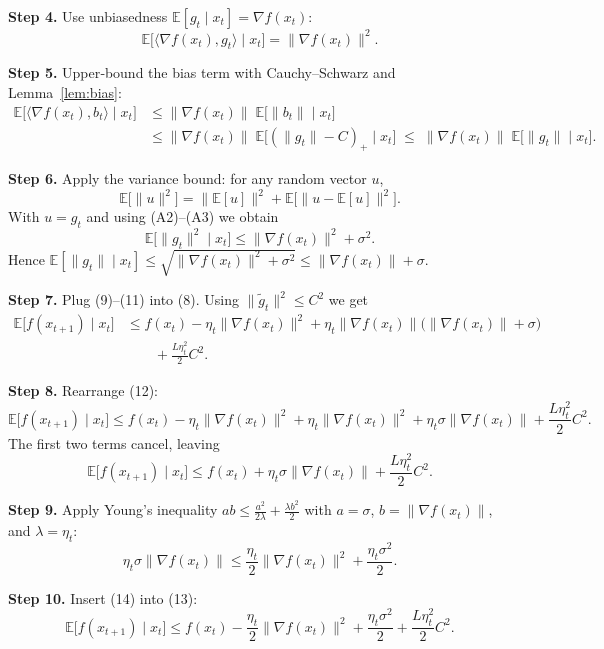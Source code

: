 \documentclass{article}
\newcommand{\E}{\mathbb{E}}
\begin{document}
\noindent\textbf{Step 4.} Use unbiasedness $\E[g_t\mid x_t]=\nabla f(x_t)$:
\[
\E\!\bigl[\langle\nabla f(x_t),g_t\rangle\mid x_t\bigr]=\|\nabla f(x_t)\|^{2}.
\tag{9}
\]

\noindent\textbf{Step 5.} Upper‑bound the bias term with Cauchy–Schwarz and Lemma~\ref{lem:bias}:
\[
\begin{aligned}
\E\!\bigl[\langle\nabla f(x_t),b_t\rangle\mid x_t\bigr]
&\le \|\nabla f(x_t)\|\;\E\!\bigl[\|b_t\|\mid x_t\bigr]   \\
&\le \|\nabla f(x_t)\|\;\E\!\bigl[(\|g_t\|-C)_{+}\mid x_t\bigr]
   \;\le\; \|\nabla f(x_t)\|\;\E\!\bigl[\|g_t\|\mid x_t\bigr].
\end{aligned}
\tag{10}
\]

\noindent\textbf{Step 6.} Apply the variance bound: for any random vector $u$,
\[
\E\!\bigl[\|u\|^{2}\bigr]=\|\E[u]\|^{2}+\E\!\bigl[\|u-\E[u]\|^{2}\bigr].
\]
With $u=g_t$ and using (A2)–(A3) we obtain
\[
\E\!\bigl[\|g_t\|^{2}\mid x_t\bigr]\le \|\nabla f(x_t)\|^{2}+\sigma^{2}.
\tag{11}
\]
Hence $\E[\|g_t\|\mid x_t]\le\sqrt{\|\nabla f(x_t)\|^{2}+\sigma^{2}}\le \|\nabla f(x_t)\|+\sigma$.

\noindent\textbf{Step 7.} Plug (9)–(11) into (8). Using $\|\tilde g_t\|^{2}\le C^{2}$ we get
\[
\begin{aligned}
\E\!\bigl[f(x_{t+1})\mid x_t\bigr]
&\le f(x_t)-\eta_t\|\nabla f(x_t)\|^{2}
    +\eta_t\|\nabla f(x_t)\|\bigl(\|\nabla f(x_t)\|+\sigma\bigr)  \\
&\qquad +\frac{L\eta_t^{2}}{2}C^{2}.
\end{aligned}
\tag{12}
\]

\noindent\textbf{Step 8.} Rearrange (12):
\[
\E\!\bigl[f(x_{t+1})\mid x_t\bigr]
\le f(x_t)-\eta_t\|\nabla f(x_t)\|^{2}
      +\eta_t\|\nabla f(x_t)\|^{2}
      +\eta_t\sigma\|\nabla f(x_t)\|
      +\frac{L\eta_t^{2}}{2}C^{2}.
\]
The first two terms cancel, leaving
\[
\E\!\bigl[f(x_{t+1})\mid x_t\bigr]
\le f(x_t)+\eta_t\sigma\|\nabla f(x_t)\|
      +\frac{L\eta_t^{2}}{2}C^{2}.
\tag{13}
\]

\noindent\textbf{Step 9.} Apply Young’s inequality $ab\le \frac{a^{2}}{2\lambda}+\frac{\lambda b^{2}}{2}$ with $a=\sigma$, $b=\|\nabla f(x_t)\|$, and $\lambda = \eta_t$:
\[
\eta_t\sigma\|\nabla f(x_t)\|
\le \frac{\eta_t}{2}\|\nabla f(x_t)\|^{2}
   +\frac{\eta_t\sigma^{2}}{2}.
\tag{14}
\]

\noindent\textbf{Step 10.} Insert (14) into (13):
\[
\E\!\bigl[f(x_{t+1})\mid x_t\bigr]
\le f(x_t)-\frac{\eta_t}{2}\|\nabla f(x_t)\|^{2}
      +\frac{\eta_t\sigma^{2}}{2}
      +\frac{L\eta_t^{2}}{2}C^{2}.
\tag{15}
\]
\end{document}
